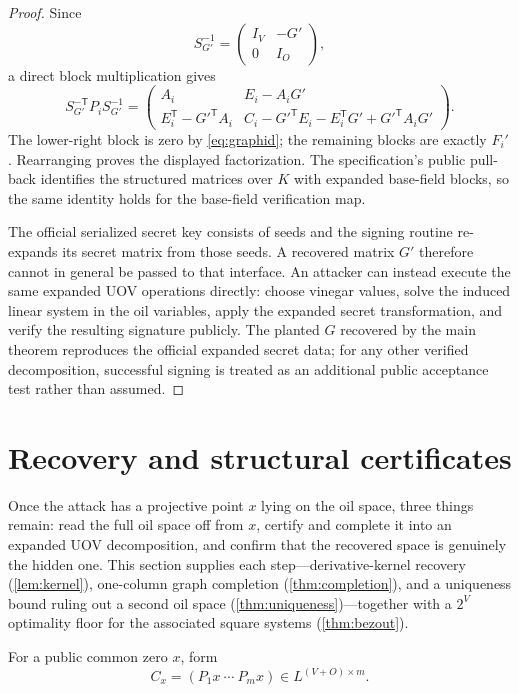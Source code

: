 \documentclass[10pt,a4paper]{article}
\newcommand{\trans}{\mathsf T}
\begin{document}
\begin{proof}
Since
\[
S_{G'}^{-1}=\begin{pmatrix}I_V&-G'\\0&I_O\end{pmatrix},
\]
a direct block multiplication gives
\[
S_{G'}^{-\trans}P_iS_{G'}^{-1}
=
\begin{pmatrix}
A_i&E_i-A_iG'\\
E_i^{\trans}-{G'}^{\trans}A_i&
C_i-{G'}^{\trans}E_i-E_i^{\trans}G'+{G'}^{\trans}A_iG'
\end{pmatrix}.
\]
The lower-right block is zero by \eqref{eq:graphid}; the remaining blocks are exactly $F_i'$.  Rearranging proves the displayed factorization.  The specification's public pull-back identifies the structured matrices over $K$ with expanded base-field blocks, so the same identity holds for the base-field verification map.

The official serialized secret key consists of seeds and the signing routine re-expands its secret matrix from those seeds.  A recovered matrix $G'$ therefore cannot in general be passed to that interface.  An attacker can instead execute the same expanded UOV operations directly: choose vinegar values, solve the induced linear system in the oil variables, apply the expanded secret transformation, and verify the resulting signature publicly.  The planted $G$ recovered by the main theorem reproduces the official expanded secret data; for any other verified decomposition, successful signing is treated as an additional public acceptance test rather than assumed.
\end{proof}

\section{Recovery and structural certificates}\label{sec:recovery}

Once the attack has a projective point $x$ lying on the oil space, three things remain: read the full oil space off from $x$, certify and complete it into an expanded UOV decomposition, and confirm that the recovered space is genuinely the hidden one. This section supplies each step---derivative-kernel recovery (\cref{lem:kernel}), one-column graph completion (\cref{thm:completion}), and a uniqueness bound ruling out a second oil space (\cref{thm:uniqueness})---together with a $2^V$ optimality floor for the associated square systems (\cref{thm:bezout}).

For a public common zero $x$, form
\[
C_x=(P_1x\ \cdots\ P_mx)\in L^{(V+O)\times m}.
\]
\end{document}
